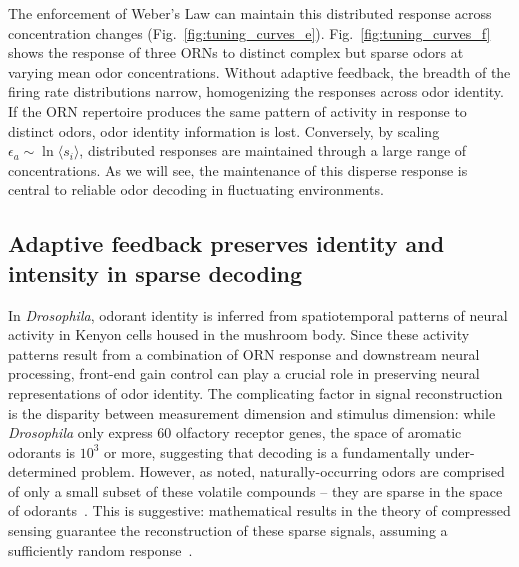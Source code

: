 The enforcement of Weber's Law can maintain this distributed response across concentration changes (Fig.~\ref{fig:tuning_curves_e}). Fig.~\ref{fig:tuning_curves_f} shows the response of three ORNs to distinct complex but sparse odors at varying mean odor concentrations. Without adaptive feedback, the breadth of the firing rate distributions narrow, homogenizing the responses across odor identity. If the ORN repertoire produces the same pattern of activity in response to distinct odors, odor identity information is lost. Conversely, by scaling $\epsilon_a \sim \ln \langle s_i \rangle$, distributed responses are maintained through a large range of concentrations. As we will see, the maintenance of this disperse response is central to reliable odor decoding in fluctuating  environments. 






\subsection{Adaptive feedback preserves identity and intensity in sparse decoding}


In \textit{Drosophila}, odorant identity is inferred from spatiotemporal patterns of neural activity in Kenyon cells housed in the mushroom body. Since these activity patterns result from a combination of ORN response and downstream neural processing, front-end gain control can play a crucial role in preserving neural representations of odor identity. The complicating factor in signal reconstruction is the disparity between measurement dimension and stimulus dimension: while \textit{Drosophila} only express 60 olfactory receptor genes, the space of aromatic odorants is $10^3$ or more, suggesting that decoding is a fundamentally under-determined problem. However, as noted, naturally-occurring odors are comprised of only a small subset of these volatile compounds -- they are sparse in the space of odorants~\cite{vijay_1}. This is suggestive: mathematical results in the theory of compressed sensing guarantee the reconstruction of these sparse signals, assuming a sufficiently random response~\cite{CS_donoho, CS_tao, CS_ganguli}.



